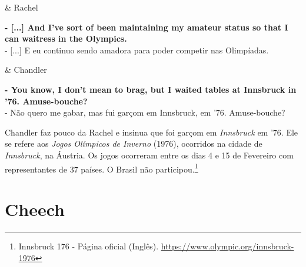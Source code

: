 \begin{tcolorbox}[enhanced,center upper,
    drop fuzzy shadow southeast, boxrule=0.3pt,
    lower separated=false, breakable,
    colframe=black!30!dialogoBorder,colback=white]
\begin{minipage}[c]{0.16\linewidth}
   & \centering \scriptsize{Rachel}
\end{minipage}
\hfill
\begin{minipage}[c]{0.8\linewidth}
  \textbf{- [...] And I've sort of been maintaining my amateur status so that I can waitress in the Olympics.}\\
  - [...] E eu continuo sendo amadora para poder competir nas Olimpíadas.
\end{minipage}

\medskip
\begin{minipage}[c]{0.16\linewidth}
   & \centering \scriptsize{Chandler}
\end{minipage}
\hfill
\begin{minipage}[c]{0.8\linewidth}
  \textbf{- You know, I don't mean to brag, but I waited tables at Innsbruck in '76. Amuse-bouche?}\\
  - Não quero me gabar, mas fui garçom em Innsbruck, em '76. Amuse-bouche?
\end{minipage}
\end{tcolorbox}

Chandler faz pouco da Rachel e insinua que foi garçom em
\emph{Innsbruck} em '76. Ele se refere aos \emph{Jogos Olímpicos de
Inverno} (1976), ocorridos na cidade de \emph{Innsbruck}, na Áustria. Os
jogos ocorreram entre os dias 4 e 15 de Fevereiro com representantes de
37 países. O Brasil não participou.\footnote{\sloppy Innsbruck 176 - Página oficial (Inglês). \url{https://www.olympic.org/innsbruck-1976}}

\hypertarget{cheech}{%
\section{Cheech}\label{cheech}}


